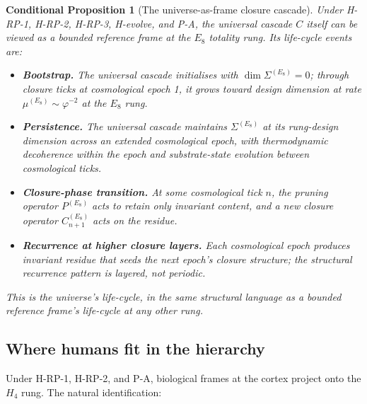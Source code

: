 \documentclass[11pt]{article}
\theoremstyle{plain}
\newtheorem{conditional}[theorem]{Conditional Proposition}
\theoremstyle{definition}
\theoremstyle{remark}
\begin{document}
\begin{conditional}[The universe-as-frame closure cascade]\label{thm:closure-cascade-universal}
Under H-RP-1, H-RP-2, H-RP-3, H-evolve, and P-A, the universal cascade $C$ itself can be viewed as a bounded reference frame at the $E_8$ totality rung. Its life-cycle events are:

\begin{itemize}[leftmargin=2em]
\item \textbf{Bootstrap.} The universal cascade initialises with $\dim \Sigma^{(E_8)} = 0$; through closure ticks at cosmological epoch 1, it grows toward design dimension at rate $\mu^{(E_8)} \sim \varphi^{-2}$ at the $E_8$ rung.
\item \textbf{Persistence.} The universal cascade maintains $\Sigma^{(E_8)}$ at its rung-design dimension across an extended cosmological epoch, with thermodynamic decoherence within the epoch and substrate-state evolution between cosmological ticks.
\item \textbf{Closure-phase transition.} At some cosmological tick $n$, the pruning operator $P^{(E_8)}$ acts to retain only invariant content, and a new closure operator $C^{(E_8)}_{n+1}$ acts on the residue.
\item \textbf{Recurrence at higher closure layers.} Each cosmological epoch produces invariant residue that seeds the next epoch's closure structure; the structural recurrence pattern is layered, not periodic.
\end{itemize}

This is the universe's life-cycle, in the same structural language as a bounded reference frame's life-cycle at any other rung.
\end{conditional}

\subsection{Where humans fit in the hierarchy}

Under H-RP-1, H-RP-2, and P-A, biological frames at the cortex project onto the $H_4$ rung. The natural identification:
\end{document}
